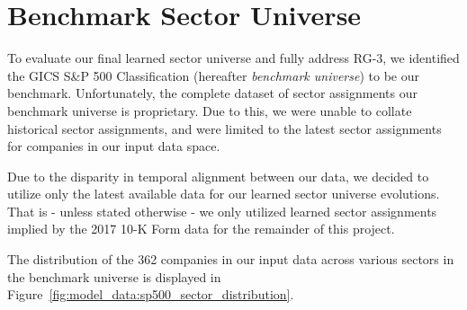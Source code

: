 \documentclass[../main.tex]{subfiles}
\begin{document}
\section{Benchmark Sector Universe}

To evaluate our final learned sector universe and fully address RG-3, we identified the GICS S\&P 500 Classification (hereafter \textit{benchmark universe}) to be our benchmark. Unfortunately, the complete dataset of sector assignments our benchmark universe is proprietary. Due to this, we were unable to collate historical sector assignments, and were limited to the latest sector assignments for companies in our input data space.

Due to the disparity in temporal alignment between our data, we decided to utilize only the latest available data for our learned sector universe evolutions. That is - unless stated otherwise - we only utilized learned sector assignments implied by the 2017 10-K Form data for the remainder of this project.

The distribution of the 362 companies in our input data across various sectors in the benchmark universe is displayed in Figure~\ref{fig:model_data:sp500_sector_distribution}.
\end{document}
